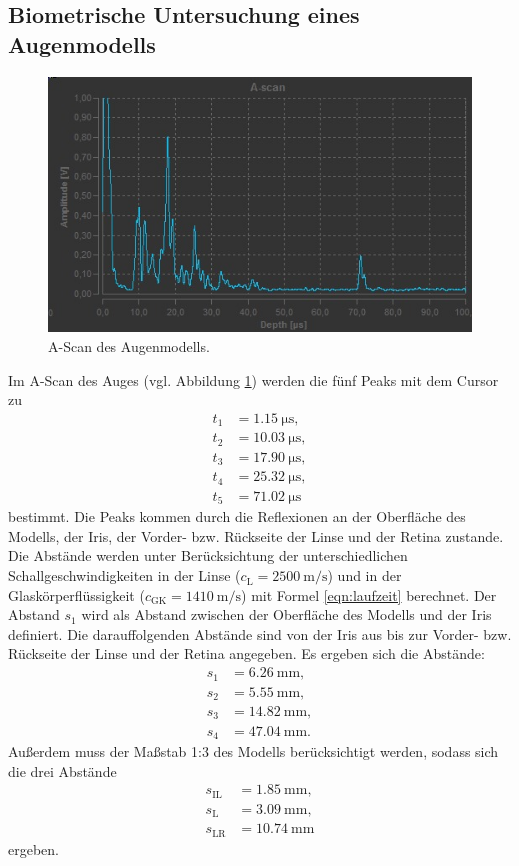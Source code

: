 \subsection{Biometrische Untersuchung eines Augenmodells}
\begin{figure}
  \centering
  \includegraphics[width=\textwidth]{Messdaten/auge_ascan.jpg}
  \caption{A-Scan des Augenmodells.}
  \label{fig:auge_ascan}
\end{figure}
Im A-Scan des Auges (vgl. Abbildung \ref{fig:auge_ascan}) werden die fünf Peaks mit dem Cursor
zu
\begin{align*}
	t_1 &= \SI{1,15}{\micro\second} \mathrm{,} \\
	t_2 &= \SI{10,03}{\micro\second} \mathrm{,}\\
	t_3 &= \SI{17,90}{\micro\second} \mathrm{,}\\
	t_4 &= \SI{25,32}{\micro\second} \mathrm{,}\\
	t_5 &= \SI{71,02}{\micro\second}
\end{align*}
bestimmt. Die Peaks kommen durch die Reflexionen an der Oberfläche des Modells, der Iris, der
Vorder- bzw. Rückseite der Linse und der Retina zustande. Die Abstände werden unter
Berücksichtung der unterschiedlichen Schallgeschwindigkeiten in der Linse ($c_{\mathrm{L}} =
\SI{2500}{\meter\per\second}$) und in der Glaskörperflüssigkeit ($c_{\mathrm{GK}} =
\SI{1410}{\meter\per\second}$) mit Formel \eqref{eqn:laufzeit} berechnet.
Der Abstand $s_1$ wird als Abstand zwischen der Oberfläche des Modells und der Iris
definiert. Die darauffolgenden Abstände sind von der Iris aus bis zur Vorder- bzw. Rückseite
der Linse und der Retina angegeben. Es ergeben sich die Abstände:
\begin{align*}
	s_1 &= \SI{6,26}{\milli\meter} \mathrm{,} \\
	s_2 &= \SI{5,55}{\milli\meter} \mathrm{,} \\
	s_3 &= \SI{14,82}{\milli\meter} \mathrm{,} \\
	s_4 &= \SI{47,04}{\milli\meter} \mathrm{.}
\end{align*}
Außerdem muss der Maßstab 1:3 des Modells berücksichtigt werden, sodass sich die drei Abstände
\begin{align*}
	s_{\mathrm{IL}} &= \SI{1,85}{\milli\meter} \mathrm{,} \\
	s_{\mathrm{L}} &= \SI{3,09}{\milli\meter} \mathrm{,} \\
	s_{\mathrm{LR}} &= \SI{10,74}{\milli\meter}
\end{align*}
ergeben.
